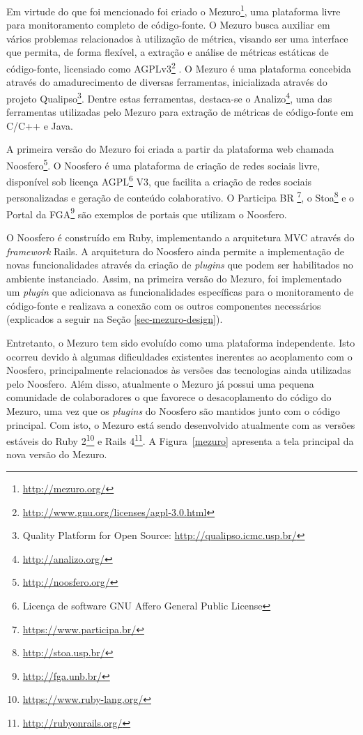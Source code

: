 Em virtude do que foi mencionado foi criado o Mezuro\footnote{\url{http://mezuro.org/}}, uma plataforma livre para monitoramento completo de código-fonte. O Mezuro busca auxiliar em vários problemas relacionados à utilização de métrica, visando ser uma interface que permita, de forma flexível, a extração e análise de métricas estáticas de código-fonte, licensiado como AGPLv3\footnote{\url{http://www.gnu.org/licenses/agpl-3.0.html}} \cite{manzo2014}. O Mezuro é uma plataforma concebida através do amadurecimento de diversas ferramentas, inicializada através do projeto Qualipso\footnote{Quality Platform for Open Source: \url{http://qualipso.icmc.usp.br/}}. Dentre estas ferramentas, destaca-se o Analizo\footnote{\url{http://analizo.org/}}, uma das ferramentas utilizadas pelo Mezuro para extração de métricas de código-fonte em C/C++ e Java.

%

A primeira versão do Mezuro foi criada a partir da plataforma web chamada Noosfero\footnote{\url{http://noosfero.org/}}. O Noosfero é uma plataforma de criação de redes sociais livre, disponível sob licença AGPL\footnote{Licença de software GNU Affero General Public License} V3, que facilita a criação de redes sociais personalizadas e geração de conteúdo colaborativo. O Participa BR \footnote{\url{https://www.participa.br/}}, o Stoa\footnote{\url{http://stoa.usp.br/}} e o Portal da FGA\footnote{\url{http://fga.unb.br/}} são exemplos de portais que utilizam o Noosfero. 

%

O Noosfero é construído em Ruby, implementando a arquitetura MVC através do \emph{framework} Rails. A arquitetura do Noosfero ainda permite a implementação de novas funcionalidades através da criação de \emph{plugins} que podem ser habilitados no ambiente instanciado. Assim, na primeira versão do Mezuro, foi implementado um \emph{plugin} que adicionava as funcionalidades específicas para o monitoramento de código-fonte e realizava a conexão com os outros componentes necessários (explicados a seguir na Seção \ref{sec-mezuro-design}).

%

Entretanto, o Mezuro tem sido evoluído como uma plataforma independente. Isto ocorreu devido à algumas dificuldades existentes inerentes ao acoplamento com o Noosfero, principalmente relacionados às versões das tecnologias ainda utilizadas pelo Noosfero. Além disso, atualmente o Mezuro já possui uma pequena comunidade de colaboradores o que favorece o desacoplamento do código do Mezuro, uma vez que os \emph{plugins} do Noosfero são mantidos junto com o código principal. Com isto, o Mezuro está sendo desenvolvido atualmente com as versões estáveis do Ruby 2\footnote{\url{https://www.ruby-lang.org/}} e Rails 4\footnote{\url{http://rubyonrails.org/}}. A Figura~\ref{mezuro} apresenta a tela principal da nova versão do Mezuro.

